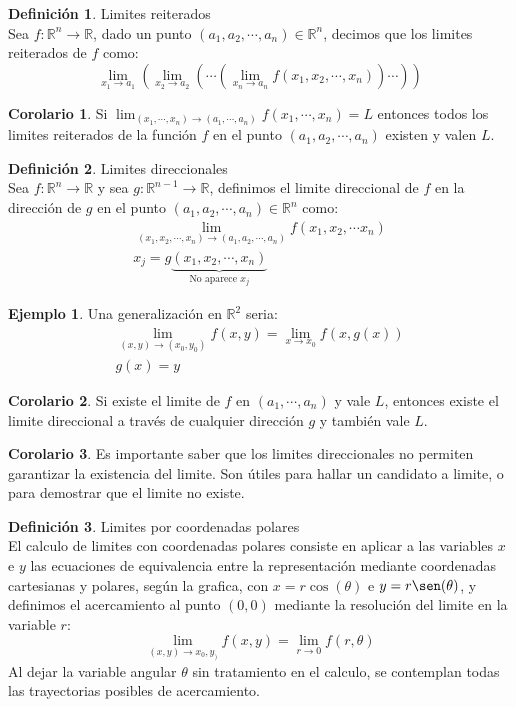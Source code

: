 \documentclass[10pt]{article}
\theoremstyle{definition}
\newtheorem{definition}{Definición}[section]
\newtheorem{corollary}{Corolario}[theorem]
\newtheorem{example}{Ejemplo}[section]
\begin{document}
\begin{definition}{Limites reiterados}
    \\Sea $f:\mathbb{R}^n\to\mathbb{R}$, dado un punto $(a_1,a_2,\cdots,a_n)\in\mathbb{R}^n$, decimos que los limites reiterados de $f$ como:$$\lim_{x_1 \to a_1}\left( \lim_{x_2 \to a_2}\left(\cdots\left( \lim_{x_n \to a_n} f(x_1,x_2,\cdots,x_n)\right)\cdots \right) \right) $$
\end{definition}
\begin{corollary}
    Si $\lim_{(x_1,\cdots,x_n) \to (a_1,\cdots,a_n)}f(x_1,\cdots,x_n)=L$ entonces todos los limites reiterados de la función $f$ en el punto $(a_1,a_2,\cdots,a_n)$ existen y valen $L$.
\end{corollary}
\begin{definition}{Limites direccionales}
    \\Sea $f:\mathbb{R}^n\to\mathbb{R}$ y sea $g:\mathbb{R}^{n-1}\to\mathbb{R}$, definimos el limite direccional de $f$ en la dirección de $g$ en el punto $(a_1,a_2,\cdots,a_n)\in\mathbb{R}^n$ como:$$\begin{array}{ l }
\lim _{( x_{1} ,x_{2} ,\cdots ,x_{n})\rightarrow ( a_{1} ,a_{2} ,\cdots ,a_{n})} f( x_{1} ,x_{2} ,\cdots x_{n})\\
x_{j} =g\underbrace{( x_{1} ,x_{2} ,\cdots ,x_{n})}_{\text{No aparece } x_{j}}
\end{array}$$
\end{definition}
\begin{example}
    Una generalización en $\mathbb{R}^2$ seria: $$\begin{array}{ c }
\lim _{( x,y)\rightarrow ( x_{0} ,y_{0})} f( x,y) =\lim _{x\rightarrow x_{0}} f( x,g( x))\\
g( x) =y
\end{array}$$
\end{example}
\begin{corollary}
    Si existe el limite de $f$ en $(a_1,\cdots,a_n)$ y vale $L$, entonces existe el limite direccional a través de cualquier dirección $g$ y también vale $L$.
\end{corollary}
\begin{corollary}
    Es importante saber que los limites direccionales no permiten garantizar la existencia del limite. Son útiles para hallar un candidato a limite, o para demostrar que el limite no existe.
\end{corollary}
\begin{definition}{Limites por coordenadas polares}
    \\El calculo de limites con coordenadas polares consiste en aplicar a las variables $x$ e $y$ las ecuaciones de equivalencia entre la representación mediante coordenadas cartesianas y polares, según la grafica, con $x=r\cos(\theta)$ e $y=r\sen(\theta)$, y definimos el acercamiento al punto $(0,0)$ mediante la resolución del limite en la variable $r$:$$\lim_{(x,y) \to x_0,y_)}f(x,y)=\lim_{r \to 0}f(r,\theta)$$
    Al dejar la variable angular $\theta$ sin tratamiento en el calculo, se contemplan todas las trayectorias posibles de acercamiento.
\end{definition}
\end{document}
